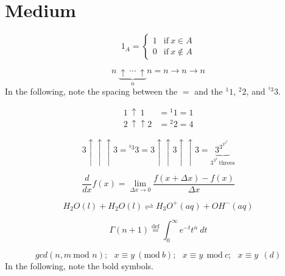 \documentclass{article}
\begin{document}
\newpage
\section{Medium}

\begin{equation}
1_A=
\begin{cases}
1 & \text{if} \ x\in A \\
0 & \text{if} \ x\notin A
\end{cases}
\end{equation}

\begin{equation}
n \ \underbrace{\uparrow \ \cdots \ \uparrow}_{n}n=n \rightarrow n \rightarrow n
\end{equation}
In the following, note the spacing between the $=$ and the ${}^{1}1$, ${}^{2}2$, and ${{}^{{}^{3}3}3}$.

\begin{equation*}
\begin{aligned}
1 \ \uparrow \ 1 &= {}^{1}1=1\\
2 \ \uparrow\uparrow 2&={}^{2}2=4
\end{aligned}
\end{equation*}

\begin{equation}
3\uparrow\uparrow\uparrow3={{}^{{}^{3}3}3}=3\uparrow\uparrow 3 \uparrow\uparrow 3=\underbrace{3^{3^{3^{3^{3^{3^{{{\cdot}^{\cdot^{\cdot^3}}}}}}}}}}_{{3^{3^{3}}} \ \text{threes}}
\end{equation}

\begin{equation}
\frac{d}{dx}f(x)=\underset{\Delta x\rightarrow 0}\lim\frac{f(x+\Delta x)-f(x)}{\Delta x}
\end{equation}

\begin{equation}
H_2O(l)+H_2O(l)\rightleftharpoons H_3O^+(aq)+OH^-(aq)
\end{equation}

\begin{equation}
\Gamma(n+1)\overset{\text{def}}=\int_0^\infty e^{-t}t^n \ dt
\end{equation}

\begin{equation}
gcd(n,m \ \text{mod }  n); \ \ \ x\equiv y \ (\text{mod} \ b); \ \ \ x\equiv y \ \ \text{mod} \ c; \ \ \ x\equiv y \ \ (d)
\end{equation}
In the following, note the bold symbols.
\end{document}
